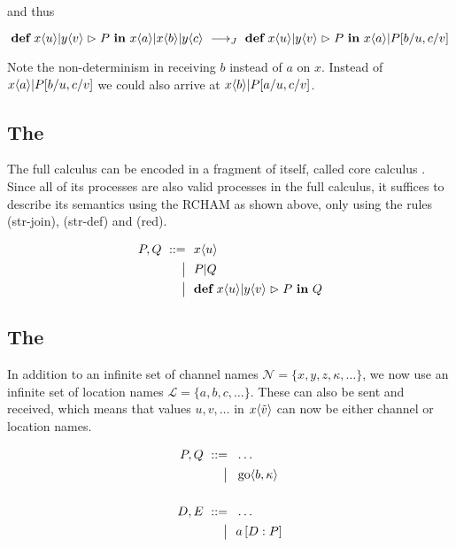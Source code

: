 and thus

\begin{equation*}
  \jdef
    {\jrct{\jrcv{x}{u} \jpat \jrcv{y}{v}}{P}}
    {\jsnd{x}{a} \jpar \jsnd{x}{b} \jpar \jsnd{y}{c}}
  \ \joinreduction\ 
  \jdef
    {\jrct{\jrcv{x}{u} \jpat \jrcv{y}{v}}{P}}
    {\jsnd{x}{a} \jpar P\substitution{\subst{b}{u}, \subst{c}{v}}}
\end{equation*}

Note the non-determinism in receiving $b$ instead of $a$ on $x$.
Instead of
$ x\langle a\rangle | P[ b / u, c / v ] $
we could also arrive at
$ x\langle b\rangle | P[ a / u, c / v ] $.


\subsection{The \CoreJoinCalc}

The full calculus can be encoded in a fragment of itself, called core calculus
\cite{fournet_reflexive_1996}.
Since all of its processes are also valid processes in the full calculus,
it suffices to describe its semantics using the RCHAM as shown above,
only using the rules (str-join), (str-def) and (red).

\begin{align*}
  P, Q
  \ ::=&\ \  x\langle u\rangle
  \\ \big|&\ \  P | Q
  \\ \big|&\ \  \textbf{def} \ x\langle u\rangle | y\langle v\rangle \vartriangleright P \ \textbf{in} \ Q
\end{align*}


\subsection{The \DistJoinCalc}


In addition to an infinite set of channel names
$ \mathcal{N} = \{ x, y, z, \kappa, \ldots \} $,
we now use an infinite set of location names
$ \mathcal{L} = \{ a, b, c, \ldots \} $.
These can also be sent and received, which means that values
$ u, v, \ldots $ in $ x\langle\tilde{v}\rangle $
can now be either channel or location names.

\begin{align*}
  P, Q
  \ ::=&\ \  \dots
  \\ \big|&\ \  \operatorname{go} \langle b, \kappa \rangle
  \\ \\
  D, E
  \ ::=&\ \  \dots
  \\ \big|&\ \  a \left[ D : P \right]
\end{align*}

